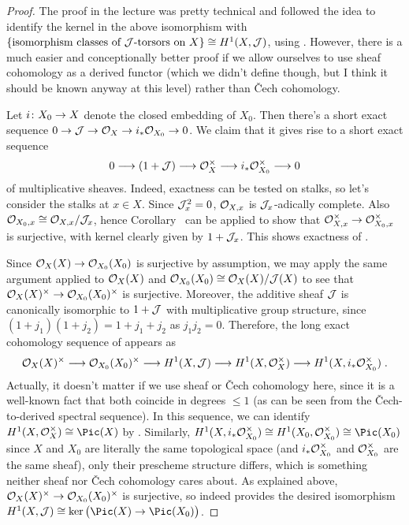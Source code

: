 \documentclass[a4paper,parskip=half,numbers=enddot, DIV=12]{scrreprt}
\renewcommand{\leq}{\leqslant}
\begin{document}
\begin{proof}
	The proof in the lecture was pretty technical and followed the idea to identify the kernel in the above isomorphism with $\left\{\text{isomorphism classes of }\mathcal{J}\text{-torsors on }X\right\}\cong H^1(X,\mathcal{J})$, using \cite[Proposition~1.7.1]{alggeo2}. However, there is a much easier and conceptionally better proof if we allow ourselves to use sheaf cohomology as a derived functor (which we didn't define though, but I think it should be known anyway at this level) rather than \v Cech cohomology.
	
	Let $i\colon X_0\morphism X$ denote the closed embedding of $X_0$. Then there's a short exact sequence $0\morphism\Jj\morphism \Oo_X\morphism i_*\Oo_{X_0}\morphism 0$. We claim that it gives rise to a short exact sequence
	\begin{align}\lbl{eq:multiplicativeSES}
		0\morphism(1+\Jj)\morphism \Oo_X^\times\morphism i_*\Oo_{X_0}^\times\morphism 0
	\end{align}
	of multiplicative sheaves. Indeed, exactness can be tested on stalks, so let's consider the stalks at $x\in X$. Since $\mathcal{J}_x^2=0$, $\mathcal{O}_{X,x}$ is $\mathcal{J}_x$-adically complete. Also $\mathcal{O}_{X_0,x}\cong \mathcal{O}_{X,x}/\mathcal{J}_x$, hence Corollary~ can be applied to show that $\Oo_{X,x}^\times\morphism \Oo_{X_0,x}^\times$ is surjective, with kernel clearly given by $1+\mathcal{J}_x$. This shows exactness of .
	
	Since $\Oo_X(X)\morphism \Oo_{X_0}(X_0)$ is surjective by assumption, we may apply the same argument applied to $\mathcal{O}_X(X)$ and $\mathcal{O}_{X_0}(X_0)\cong \mathcal{O}_X(X)/\mathcal{J}(X)$ to see that $\Oo_X(X)^\times\morphism\Oo_{X_0}(X_0)^\times$ is surjective. Moreover, the additive sheaf $\mathcal{J}$ is canonically isomorphic to $1+\mathcal{J}$ with multiplicative group structure, since $(1+j_1)(1+j_2)=1+j_1+j_2$ as $j_1j_2=0$. Therefore, the long exact cohomology sequence of  appears as
	\begin{align}\lbl{eq:multiplicativeCohoSeq}
		\Oo_X(X)^\times\morphism\Oo_{X_0}(X_0)^\times \morphism H^1(X,\Jj)\morphism H^1(X,\Oo_X^\times)\morphism H^1(X,i_*\Oo_{X_0}^\times)\;.
	\end{align}
	Actually, it doesn't matter if we use sheaf or \v Cech cohomology here, since it is a well-known fact that both coincide in degrees $\leq 1$ (as can be seen from the \v Cech-to-derived spectral sequence). In this sequence, we can identify $H^1(X,\Oo_X^\times)\cong \Pic(X)$ by \cite[Section~1.7]{alggeo2}. Similarly, $H^1(X,i_*\Oo_{X_0}^\times)\cong H^1(X_0,\Oo_{X_0}^\times)\cong \Pic(X_0)$ since $X$ and $X_0$ are literally the same topological space (and $i_*\mathcal{O}_{X_0}^\times$ and $\mathcal{O}_{X_0}^\times$ are the same sheaf), only their prescheme structure differs, which is something neither sheaf nor \v Cech cohomology cares about. As explained above, $\Oo_X(X)^\times\morphism\Oo_{X_0}(X_0)^\times$ is surjective, so  indeed provides the desired isomorphism $H^1(X,\Jj)\cong\ker\big(\Pic(X)\morphism\Pic(X_0)\big)$.
	

\end{proof}
\end{document}
